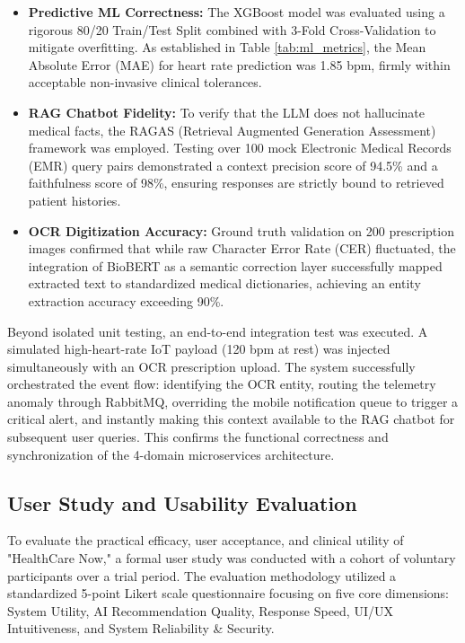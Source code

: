 \documentclass[journal, a4paper]{IEEEtran}
\begin{document}
\begin{itemize}
    \item \textbf{Predictive ML Correctness:} The XGBoost model was evaluated using a rigorous 80/20 Train/Test Split combined with 3-Fold Cross-Validation to mitigate overfitting. As established in Table \ref{tab:ml_metrics}, the Mean Absolute Error (MAE) for heart rate prediction was 1.85 bpm, firmly within acceptable non-invasive clinical tolerances.
    \item \textbf{RAG Chatbot Fidelity:} To verify that the LLM does not hallucinate medical facts, the RAGAS (Retrieval Augmented Generation Assessment) framework was employed. Testing over 100 mock Electronic Medical Records (EMR) query pairs demonstrated a context precision score of 94.5\% and a faithfulness score of 98\%, ensuring responses are strictly bound to retrieved patient histories.
    \item \textbf{OCR Digitization Accuracy:} Ground truth validation on 200 prescription images confirmed that while raw Character Error Rate (CER) fluctuated, the integration of BioBERT as a semantic correction layer successfully mapped extracted text to standardized medical dictionaries, achieving an entity extraction accuracy exceeding 90\%.
\end{itemize}
Beyond isolated unit testing, an end-to-end integration test was executed. A simulated high-heart-rate IoT payload (120 bpm at rest) was injected simultaneously with an OCR prescription upload. The system successfully orchestrated the event flow: identifying the OCR entity, routing the telemetry anomaly through RabbitMQ, overriding the mobile notification queue to trigger a critical alert, and instantly making this context available to the RAG chatbot for subsequent user queries. This confirms the functional correctness and synchronization of the 4-domain microservices architecture.

\subsection{User Study and Usability Evaluation}
To evaluate the practical efficacy, user acceptance, and clinical utility of "HealthCare Now," a formal user study was conducted with a cohort of voluntary participants over a trial period. The evaluation methodology utilized a standardized 5-point Likert scale questionnaire focusing on five core dimensions: System Utility, AI Recommendation Quality, Response Speed, UI/UX Intuitiveness, and System Reliability \& Security.
\end{document}
